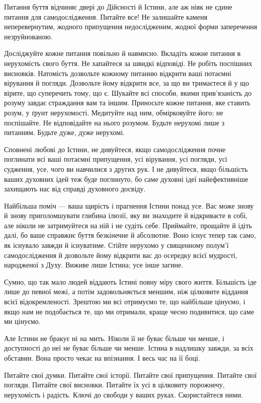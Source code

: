 Питання буття відчиняє двері до Дійсності й Істини, але аж ніяк не єдине питання для самодослідження. Питайте все! Не залишайте каменя неперевернутим, жодного припущення недослідженим, жодної форми заперечення незруйнованою.

Досліджуйте кожне питання повільно й навмисно. Вкладіть кожне питання в нерухомість свого буття. Не хапайтеся за швидкі відповіді. Не робіть поспішних висновків. Натомість дозвольте кожному питанню відкрити ваші потаємні вірування й погляди. Дозвольте йому відкрити все, за що ви тримаєтеся й у що вірите, що суперечить тому, що є. Шукайте всі способи, якими прив'язаність до розуму завдає страждання вам та іншим. Приносьте кожне питання, яке ставить розум, у ґрунт нерухомості. Медитуйте над ним, обмірковуйте його; не поспішайте. Не відповідайте на нього розумом. Будьте нерухомі лише з питанням. Будьте дуже, дуже нерухомі.

Сповнені любові до Істини, не дивуйтеся, якщо самодослідження почне поглинати всі ваші потаємні припущення, усі вірування, усі погляди, усі судження, усе, чого ви навчилися з других рук. І не дивуйтеся, якщо більшість ваших духовних ідей теж буде поглинуто, бо саме духовні ідеї найефективніше захищають нас від справді духовного досвіду.

Найбільша поміч — ваша щирість і прагнення Істини понад усе. Вас може знову й знову приголомшувати глибина ілюзії, яку ви знаходите й відкриваєте в собі, але ніколи не затримуйтеся на ній і не судіть себе. Приймайте, прощайте й ідіть далі, бо ваше справжнє буття безкінечне й абсолютне. Воно існує тепер так само, як існувало завжди й існуватиме. Стійте нерухомо у священному полум'ї самодослідження й дозвольте йому відкрити вас до осередку всієї мудрості, народженої з Духу. Виживе лише Істина; усе інше загине.

Сумно, що так мало людей віддають Істині повну міру свого життя. Більшість іде лише до певної межі, а потім задовольняється меншим, ніж цілковите віддання всієї відокремленості. Зрештою ми всі отримуємо те, що найбільше цінуємо, і якщо нам не подобається те, що ми отримали, краще чесно подивитися, що саме ми цінуємо.

Але Істини не бракує ні на мить. Ніколи її не буває більше чи менше, і доступності до неї не буває більше чи менше. Істина в надлишку завжди, за всіх обставин. Вона просто чекає на впізнання. І весь час на її боці.

Питайте свої думки. Питайте свої історії. Питайте свої припущення. Питайте свої погляди. Питайте свої висновки. Питайте їх усі в цілковиту порожнечу, нерухомість і радість. Ключі до свободи у ваших руках. Скористайтеся ними.


